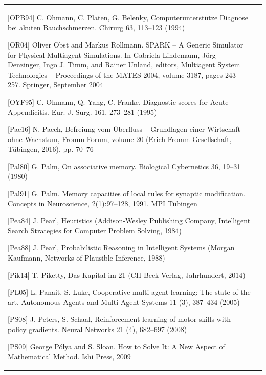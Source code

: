 \documentclass[10pt]{book}
\begin{document}
\begin{tabular}{|l|l|}
[OPB94] C. Ohmann, C. Platen, G. Belenky, Computerunterstütze Diagnose bei akuten Bauchschmerzen. Chirurg 63, 113–123 (1994)

[OR04] Oliver Obst and Markus Rollmann. SPARK – A Generic Simulator for Physical Multiagent Simulations. In Gabriela Lindemann, Jörg Denzinger, Ingo J. Timm, and Rainer Unland, editors, Multiagent System Technologies – Proceedings of the MATES 2004, volume 3187, pages 243–257. Springer, September 2004

[OYF95] C. Ohmann, Q. Yang, C. Franke, Diagnostic scores for Acute Appendicitis. Eur. J. Surg. 161, 273–281 (1995)

[Pae16] N. Paech, Befreiung vom Überfluss – Grundlagen einer Wirtschaft ohne Wachstum, Fromm Forum, volume 20 (Erich Fromm Gesellschaft, Tübingen, 2016), pp. 70–76

[Pal80] G. Palm, On associative memory. Biological Cybernetics 36, 19–31 (1980)

[Pal91] G. Palm. Memory capacities of local rules for synaptic modification. Concepts in Neuroscience, 2(1):97–128, 1991. MPI Tübingen

[Pea84] J. Pearl, Heuristics (Addison-Wesley Publishing Company, Intelligent Search Strategies for Computer Problem Solving, 1984)

[Pea88] J. Pearl, Probabilistic Reasoning in Intelligent Systems (Morgan Kaufmann, Networks of Plausible Inference, 1988)

[Pik14] T. Piketty, Das Kapital im 21 (CH Beck Verlag, Jahrhundert, 2014)

[PL05] L. Panait, S. Luke, Cooperative multi-agent learning: The state of the art. Autonomous Agents and Multi-Agent Systems 11 (3), 387–434 (2005)

[PS08] J. Peters, S. Schaal, Reinforcement learning of motor skills with policy gradients. Neural Networks 21 (4), 682–697 (2008)

[PS09] George Pólya and S. Sloan. How to Solve It: A New Aspect of Mathematical Method. Ishi Press, 2009


\end{tabular}
\end{document}
